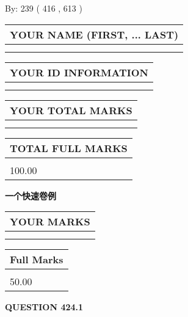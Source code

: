 \documentclass{ctexart}
\begin{document}
   
\hspace{1.0in} By: 
 239 ( 416 ,  613 )
   
   
   
   
\newpage 
\setcounter{page}{ 
   424001 } 
   
   
   
   
\noindent\begin{tabular}{|l|}
\hline
YOUR NAME (FIRST, ... LAST)  \\
\hline
 \\ 
 \\ 
\hline
\end{tabular}
\hspace{0.05in} \begin{tabular}{|l|}
\hline
 YOUR   ID   INFORMATION  \\
\hline
 \\ 
 \\ 
\hline
\end{tabular}
   
   
\vspace{0.2in}\noindent\begin{tabular}{|l|}
\hline
YOUR TOTAL MARKS  \\
\hline
 \\ 
 \\ 
\hline
\end{tabular}
\hspace{0.05in} \begin{tabular}{|l|}
\hline
TOTAL FULL MARKS  \\
\hline
 \\ 
100.00 \\
\hline
\end{tabular}
   
   
 \vspace{0.2in}
{\LARGE {\textbf{ 一个快速卷例}}}
   
   
  
\vspace{0.2in}
  
\noindent\begin{tabular}{|l|}
\hline
 YOUR MARKS  \\
\hline
 \\ 
 \\ 
\hline
\end{tabular}
\hspace{0.05in} \begin{tabular}{|l|}
\hline
 Full Marks  \\
\hline
 \\ 
50.00 \\
\hline
\end{tabular}
{\textbf{\Large{QUESTION
424.1 
}}}
  
\end{document}
